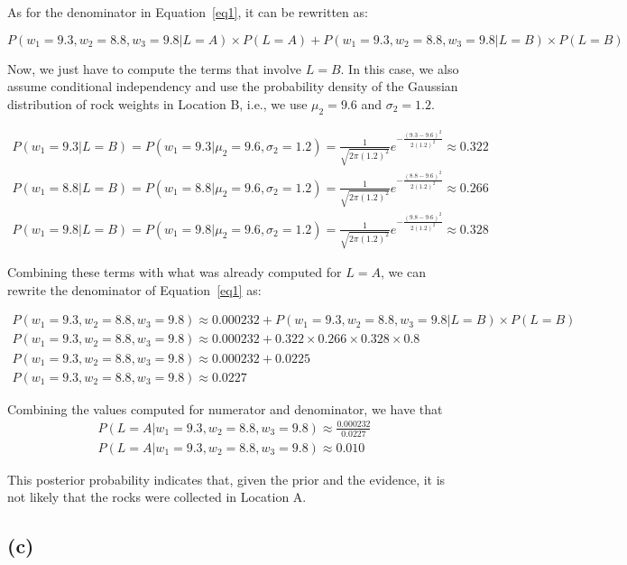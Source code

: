 \documentclass{article}
\begin{document}
As for the denominator in Equation~\ref{eq1}, it can be rewritten as:

\begin{equation*}
P(w_1 = 9.3, w_2 = 8.8, w_3 = 9.8| L = A) \times P(L = A) + P(w_1 = 9.3, w_2 = 8.8, w_3 = 9.8| L = B) \times P(L = B) 
\end{equation*}

Now, we just have to compute the terms that involve $L = B$. In this case, we also assume conditional independency and use the probability density of the 
Gaussian distribution of rock weights in Location B, i.e., we use $\mu_2 = 9.6$ and $\sigma_2 = 1.2$.

\begin{equation*}
\begin{split}
P(w_1 = 9.3 | L = B) = P(w_1 = 9.3 | \mu_2 = 9.6, \sigma_2 = 1.2) = \frac{1}{\sqrt{2\pi(1.2)^2}}e^{-\frac{(9.3 - 9.6)^2}{2(1.2)^2}} \approx 0.322 
\\
P(w_1 = 8.8 | L = B) = P(w_1 = 8.8 | \mu_2 = 9.6, \sigma_2 = 1.2) = \frac{1}{\sqrt{2\pi(1.2)^2}}e^{-\frac{(8.8 - 9.6)^2}{2(1.2)^2}} \approx 0.266
\\
P(w_1 = 9.8 | L = B) = P(w_1 = 9.8 | \mu_2 = 9.6, \sigma_2 = 1.2) = \frac{1}{\sqrt{2\pi(1.2)^2}}e^{-\frac{(9.8 - 9.6)^2}{2(1.2)^2}} \approx 0.328
\end{split}
\end{equation*}

Combining these terms with what was already computed for $L = A$, we can rewrite the denominator of Equation~\ref{eq1} as:

\begin{equation*}
\begin{split}
P(w_1 = 9.3, w_2 = 8.8, w_3 = 9.8) \approx 0.000232 + P(w_1 = 9.3, w_2 = 8.8, w_3 = 9.8| L = B) \times P(L = B)
\\
P(w_1 = 9.3, w_2 = 8.8, w_3 = 9.8) \approx 0.000232 +  0.322 \times 0.266 \times 0.328 \times 0.8
\\
P(w_1 = 9.3, w_2 = 8.8, w_3 = 9.8) \approx 0.000232 + 0.0225 
\\
P(w_1 = 9.3, w_2 = 8.8, w_3 = 9.8) \approx 0.0227
\end{split}
\end{equation*}

Combining the values computed for numerator and denominator, we have that
\begin{equation*}
\begin{split}
P(L = A| w_1 = 9.3, w_2 = 8.8, w_3 = 9.8) \approx \frac{0.000232}{0.0227}
\\
P(L = A| w_1 = 9.3, w_2 = 8.8, w_3 = 9.8) \approx 0.010
\end{split}
\end{equation*}

This posterior probability indicates that, given the prior and the evidence, it is not likely that the rocks were collected in Location A.

\subsection*{(c)}
  
\end{document}
